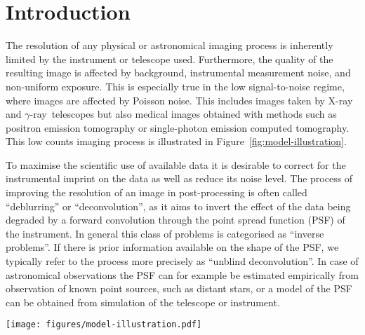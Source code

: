 \documentclass[twocolumn]{aastex631}
\newcommand{\gammaray}{$\gamma$-ray\xspace}
\newcommand{\xray}{X-ray\xspace}
\begin{document}


    \section{Introduction}
    The resolution of any physical or astronomical imaging process is inherently limited by the instrument or telescope used. Furthermore, the quality of the resulting image is affected by background, instrumental measurement noise, and non-uniform exposure. This is especially true in the low signal-to-noise regime, where images are affected by Poisson noise. This includes images taken by \xray and \gammaray~telescopes but also medical images obtained with methods such as positron emission tomography or single-photon emission computed tomography. This low counts imaging process is illustrated in Figure~\ref{fig:model-illustration}.

    To maximise the scientific use of available data it is desirable to correct for the instrumental imprint on the data as well as reduce its noise level. The process of improving the resolution of an image in post-processing is often called \enquote{deblurring} or \enquote{deconvolution}, as it aims to invert the effect of the data being degraded by a forward convolution through the point spread function (PSF) of the instrument. In general this class of problems is categorised as \enquote{inverse problems}. If there is prior information available on the shape of the PSF, we typically refer to the process more precisely as \enquote{unblind deconvolution}. In case of astronomical observations the PSF can for example be estimated empirically from observation of known point sources, such as distant stars, or a model of the PSF can be obtained from simulation of the telescope or instrument.

    \begin{figure*}
        \begin{centering}
            \texttt{[image: figures/model-illustration.pdf]}
            \caption{
                Illustration of the forward model of the low counts imaging process. The flux represents the true unknown flux distribution in the sky. The flux is convolved with an image of the PSF, which represents an estimate of the resolution of the imaging instrument. The exposure consists of the superposition of multiple independent observations with different observation time and pointing position. The exposure weighted flux image is degraded by Poisson noise.
            }
            \label{fig:model-illustration}
        \end{centering}
    \end{figure*}
    
\end{document}
